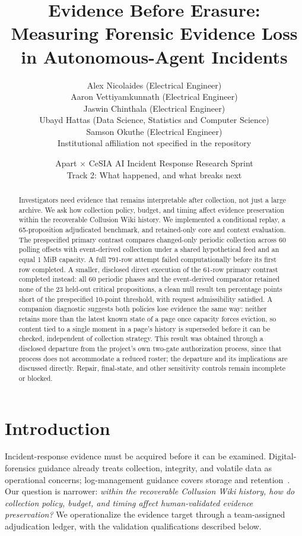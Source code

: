 \documentclass[11pt]{article}
\title{\vspace{-1.4em}Evidence Before Erasure:\\Measuring Forensic Evidence Loss in Autonomous-Agent Incidents}
\author{\begin{tabular}{c}
Alex Nicolaides (Electrical Engineer)\\
Aaron Vettiyamkunnath (Electrical Engineer)\\
Jaswin Chinthala (Electrical Engineer)\\
Ubayd Hattas (Data Science, Statistics and Computer Science)\\
Samson Okuthe (Electrical Engineer)\\[3pt]
\small Institutional affiliation not specified in the repository
\end{tabular}}
\date{\small Apart $\times$ CeSIA AI Incident Response Research Sprint\\Track 2: What happened, and what breaks next}
\begin{document}
\maketitle
\thispagestyle{fancy}

\begin{abstract}
Investigators need evidence that remains interpretable after collection, not just a large archive. We ask how collection policy, budget, and timing affect evidence preservation within the recoverable Collusion Wiki history. We implemented a conditional replay, a 65-proposition adjudicated benchmark, and retained-only core and context evaluation. The prespecified primary contrast compares changed-only periodic collection across 60 polling offsets with event-derived collection under a shared hypothetical feed and an equal 1 MiB capacity. A full 791-row attempt failed computationally before its first row completed. A smaller, disclosed direct execution of the 61-row primary contrast completed instead: all 60 periodic phases and the event-derived comparator retained none of the 23 held-out critical propositions, a clean null result ten percentage points short of the prespecified 10-point threshold, with request admissibility satisfied. A companion diagnostic suggests both policies lose evidence the same way: neither retains more than the latest known state of a page once capacity forces eviction, so content tied to a single moment in a page's history is superseded before it can be checked, independent of collection strategy. This result was obtained through a disclosed departure from the project's own two-gate authorization process, since that process does not accommodate a reduced roster; the departure and its implications are discussed directly. Repair, final-state, and other sensitivity controls remain incomplete or blocked.
\end{abstract}

\section{Introduction}
Incident-response evidence must be acquired before it can be examined. Digital-forensics guidance already treats collection, integrity, and volatile data as operational concerns; log-management guidance covers storage and retention~\cite{nist86,nist92}. Our question is narrower: \emph{within the recoverable Collusion Wiki history, how do collection policy, budget, and timing affect human-validated evidence preservation?} We operationalize the evidence target through a team-assigned adjudication ledger, with the validation qualifications described below.
\end{document}
